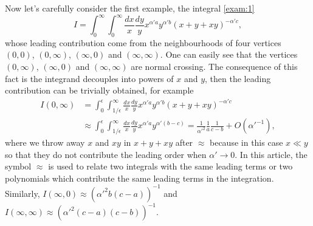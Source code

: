 \documentclass[12pt]{article}
\theoremstyle{definition}
\theoremstyle{plain}
\begin{document}
Now let's carefully consider the first example, the integral \eqref{exam:1}
\[
	I=\int_0^\infty \int_0^\infty\frac{dx}{x}\frac{dy}{y}x^{\alpha' a}y^{\alpha' b}(x+y+x y)^{-\alpha' c},
\]
whose leading contribution come from the neighbourhoods of four vertices $(0,0)$, $(0,\infty)$, $(\infty,0)$ and $(\infty,\infty)$. One can easily see that the vertices $(0,\infty)$, $(\infty,0)$ and $(\infty,\infty)$ are normal crossing. The consequence of this fact is the integrand decouples into powers of $x$ and $y$, then the leading contribution can be trivially obtained, for example 
\begin{align*}
	I(0,\infty)&=\int_{0}^\epsilon\int_{1/\epsilon}^\infty \frac{dx}{x}\frac{dy}{y}x^{\alpha' a}y^{\alpha' b}(x+y+xy)^{-\alpha' c} \\
	&\approx \int_{0}^\epsilon\int_{1/\epsilon}^\infty \frac{dx}{x}\frac{dy}{y}x^{\alpha' a}y^{\alpha' (b-c)}= 
	\frac{1}{{\alpha'}^2}\frac{1}{a} \frac{1}{c-b}+O({\alpha'}^{-1}),
\end{align*}
where we throw away $x$ and $xy$ in $x+y+xy$ after $\approx$ because in this case $x\ll y$
so that they do not contribute the leading order when $\alpha' \to 0$.
In this article, the symbol $\approx$ is used to relate two integrals with the same leading terms 
or two polynomials which contribute the same leading terms in the integration.
Similarly, $I(\infty,0)\approx ({\alpha'}^2 b (c-a))^{-1}$ and $I(\infty,\infty)\approx (\alpha'^{2}(c-a) (c-b))^{-1}.$
\end{document}
